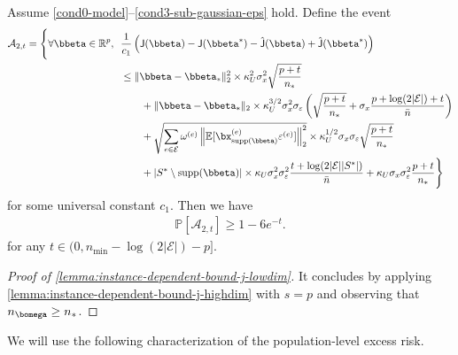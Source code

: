 \documentclass[10pt]{article}
\numberwithin{equation}{section}
\newcommand*{\supp}{\mathrm{supp}}
\begin{document}
\begin{lemma}
\label{lemma:instance-dependent-bound-j-lowdim}
Assume \cref{cond0-model}--\ref{cond3-sub-gaussian-eps} hold. Define the event
\begin{align}
\begin{split}
    \mathcal{A}_{2,t} = \Bigg\{ \forall \bbeta \in \mathbb{R}^p, ~~& \frac{1}{c_1} \left(\mathsf{J}(\bbeta) - \mathsf{J}(\bbeta^*) - \hat{\mathsf{J}}(\bbeta) + \hat{\mathsf{J}}(\bbeta^*)\right) \\
    &\le \|\bbeta - \bbeta_*\|_2^2 \times \kappa_U^2\sigma_x^2\sqrt{\frac{p+t}{n_*}} \\
    &~~~~~~ + \|\bbeta - \bbeta_*\|_2 \times \kappa_U^{3/2}\sigma_x^2 \sigma_\varepsilon \left( \sqrt{\frac{p + t}{n_*}} +\sigma_x \frac{p + \log(2|\mathcal{E}|)+t}{\bar{n}}\right)\\
    &~~~~~~ + \sqrt{\sum_{e\in \mathcal{E}} \omega^{(e)} \left\|\mathbb{E} [\bx_{\supp(\bbeta)}^{(e)} \varepsilon^{(e)}]\right\|_2^2} \times \kappa_U^{1/2} \sigma_x \sigma_\varepsilon \sqrt{\frac{p+t}{n_*}}  \\
    &~~~~~~ + |S^*\setminus \supp(\bbeta)| \times \kappa_U \sigma_x^2\sigma_\varepsilon^2  \frac{t+ \log(2|\mathcal{E}||S^*|)}{\bar{n}} + \kappa_U \sigma_x \sigma_\varepsilon^2 \frac{p+t}{n_*}
    \Bigg\}
\end{split}
\end{align} for some universal constant $c_1$. Then we have
\begin{align}
    \mathbb{P} [\mathcal{A}_{2,t}] \ge 1-6e^{-t}.
\end{align} for any $t\in (0, n_{\min} - \log(2|\mathcal{E}|) - p]$.

\end{lemma}
\begin{proof}[Proof of \cref{lemma:instance-dependent-bound-j-lowdim}]
    It concludes by applying \cref{lemma:instance-dependent-bound-j-highdim} with $s=p$ and observing that $n_{\bomega} \ge n_*$.
\end{proof}

We will use the following characterization of the population-level excess risk.
\end{document}

